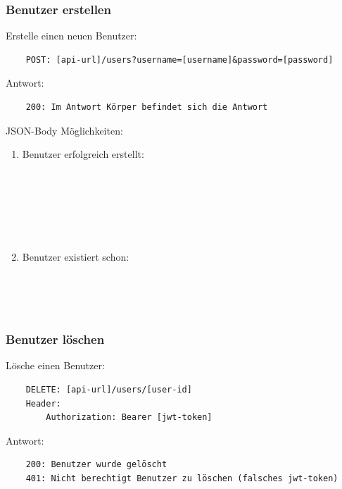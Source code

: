 \documentclass{article}
\begin{document}
\subsubsection{Benutzer erstellen}
Erstelle einen neuen Benutzer:
\begin{verbatim}
    POST: [api-url]/users?username=[username]&password=[password]
\end{verbatim}
Antwort:
\begin{verbatim}
    200: Im Antwort Körper befindet sich die Antwort
\end{verbatim}
JSON-Body Möglichkeiten:
\begin{enumerate}
    \item Benutzer erfolgreich erstellt:
    
    \noindent
    \ttfamily
    \hldef{}\hlkwa{\{}\hspace*{\fill}\\
    \hldef{}\hldef{\ \ \ \ }\hldef{}\hldef{}\hlopt{:\ }\hldef{}\hldef{}\hlopt{,}\hspace*{\fill}\\
    \hldef{}\hldef{\ \ \ \ }\hldef{}\hldef{}\hlopt{:\ }\hldef{}\hldef{}\hlopt{,}\hspace*{\fill}\\
    \hldef{}\hldef{\ \ \ \ }\hldef{}\hldef{}\hlopt{:\ }\hldef{}\hldef{}\hspace*{\fill}\\
    \hldef{}\hlkwa{\}}\hldef{}\hspace*{\fill}\\
    \mbox{}
    \normalfont
    \normalsize
    \item Benutzer existiert schon:
    
    \noindent
    \ttfamily
    \hldef{}\hlkwa{\{}\hspace*{\fill}\\
    \hldef{}\hldef{\ \ \ \ }\hldef{}\hldef{}\hlopt{:\ }\hldef{}\hldef{}\hspace*{\fill}\\
    \hldef{}\hlkwa{\}}\hldef{}\hspace*{\fill}\\
    \mbox{}
    \normalfont
    \normalsize
\end{enumerate}

\subsubsection{Benutzer löschen}
Lösche einen Benutzer:
\begin{verbatim}
    DELETE: [api-url]/users/[user-id]
    Header:
        Authorization: Bearer [jwt-token]
\end{verbatim}
Antwort:
\begin{verbatim}
    200: Benutzer wurde gelöscht
    401: Nicht berechtigt Benutzer zu löschen (falsches jwt-token)
\end{verbatim}
\end{document}
